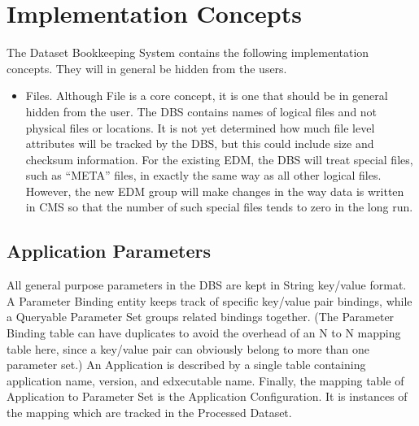 \documentclass{cmspaper}
\begin{document}
{\section{Implementation Concepts}

The Dataset Bookkeeping System contains the following implementation concepts. 
They will in general be hidden from the users.  

\begin{itemize}
\item Files.  Although File is a core concept, it is one that should be 
in general hidden from the user. The DBS contains names of logical files and 
not physical files or locations.  It is not yet determined how much file 
level attributes will be tracked by the DBS, but this could include size and 
checksum information.
For the existing EDM, the DBS will treat special files, such as ``META'' 
files, in exactly the same way as all other logical files. However, the new
EDM group will make changes in the way data is written in CMS so that the 
number of such special files tends to zero in the long run.  



\end{itemize}

\subsection{Application Parameters}

All general purpose parameters in the DBS are kept in String key/value 
format.  A Parameter Binding entity keeps track of specific key/value pair 
bindings, while a Queryable Parameter Set groups related bindings together. 
(The Parameter Binding table can have duplicates to avoid the overhead of 
an N to N mapping table here, since a key/value pair can obviously belong to 
more than one parameter set.) An Application is described by a single table 
containing application name, version, and edxecutable name.  Finally, the 
mapping table of Application to Parameter Set is the Application 
Configuration.  It is instances of the mapping which are tracked in the 
Processed Dataset.


}
\end{document}
